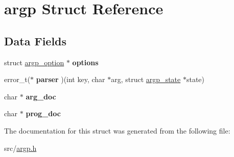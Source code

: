 \hypertarget{structargp}{}\section{argp Struct Reference}
\label{structargp}
\subsection*{Data Fields}
\begin{DoxyCompactItemize}
\item 
\hypertarget{structargp_aaeb2bd89ece316f4466af75486104cb6}{}\label{structargp_aaeb2bd89ece316f4466af75486104cb6} 
struct \hyperlink{structargp__option}{argp\+\_\+option} $\ast$ {\bfseries options}
\item 
\hypertarget{structargp_a0a9d767db8c298b1afb900c584cfe177}{}\label{structargp_a0a9d767db8c298b1afb900c584cfe177} 
error\+\_\+t($\ast$ {\bfseries parser} )(int key, char $\ast$arg, struct \hyperlink{structargp__state}{argp\+\_\+state} $\ast$state)
\item 
\hypertarget{structargp_a875bcad7cb60ff2995a86ef2913c9ae9}{}\label{structargp_a875bcad7cb60ff2995a86ef2913c9ae9} 
char $\ast$ {\bfseries arg\+\_\+doc}
\item 
\hypertarget{structargp_abc7fc5e86d54951d9a9970612e26e7ad}{}\label{structargp_abc7fc5e86d54951d9a9970612e26e7ad} 
char $\ast$ {\bfseries prog\+\_\+doc}
\end{DoxyCompactItemize}


The documentation for this struct was generated from the following file\+:\begin{DoxyCompactItemize}
\item 
src/\hyperlink{argp_8h}{argp.\+h}\end{DoxyCompactItemize}
